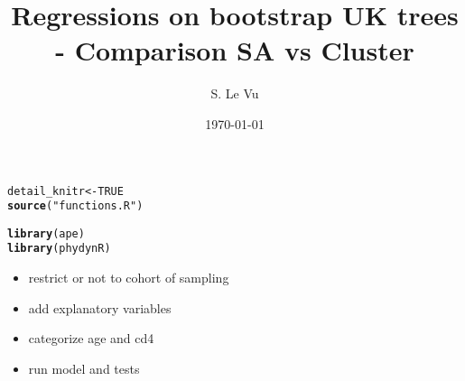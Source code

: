\documentclass[]{revtex4}\usepackage[]{graphicx}\usepackage[]{color}
\makeatletter
\newcommand{\hlnum}[1]{\textcolor[rgb]{0.686,0.059,0.569}{#1}}%
\newcommand{\hlstr}[1]{\textcolor[rgb]{0.192,0.494,0.8}{#1}}%
\newcommand{\hlstd}[1]{\textcolor[rgb]{0.345,0.345,0.345}{#1}}%
\newcommand{\hlkwb}[1]{\textcolor[rgb]{0.69,0.353,0.396}{#1}}%
\newcommand{\hlkwd}[1]{\textcolor[rgb]{0.737,0.353,0.396}{\textbf{#1}}}%
\newenvironment{kframe}{%
 \def\at@end@of@kframe{}%
 \ifinner\ifhmode%
  \def\at@end@of@kframe{\end{minipage}}%
  \begin{minipage}{\columnwidth}%
 \fi\fi%
 \def\FrameCommand##1{\hskip\@totalleftmargin \hskip-\fboxsep
 \colorbox{shadecolor}{##1}\hskip-\fboxsep
     \hskip-\linewidth \hskip-\@totalleftmargin \hskip\columnwidth}%
 \MakeFramed {\advance\hsize-\width
   \@totalleftmargin\z@ \linewidth\hsize
   \@setminipage}}%
 {\par\unskip\endMakeFramed%
 \at@end@of@kframe}
\newenvironment{knitrout}{}{} %
\makeatother
\begin{document}
\title{Regressions on bootstrap UK trees - Comparison SA vs Cluster}
\author{S. Le Vu}
\date{\today}

\maketitle





\begin{knitrout}
\color{fgcolor}\begin{kframe}
\begin{alltt}
\hlstd{detail_knitr} \hlkwb{<-} \hlnum{TRUE}
\hlkwd{source}\hlstd{(}\hlstr{"functions.R"}\hlstd{)}
\end{alltt}
\end{kframe}
\end{knitrout}

\begin{knitrout}
\color{fgcolor}\begin{kframe}
\begin{alltt}
\hlkwd{library}\hlstd{(ape)}
\hlkwd{library}\hlstd{(phydynR)}
\end{alltt}
\end{kframe}
\end{knitrout}

\begin{itemize}
\item restrict or not to cohort of sampling 
\item add explanatory variables
\item categorize age and cd4
\item run model and tests
\end{itemize}
\end{document}
